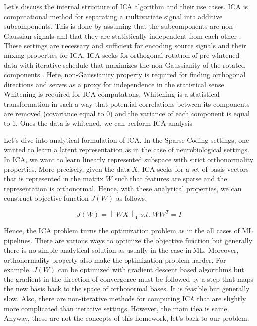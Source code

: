 \documentclass[12pt]{amsart}
\newcommand\norm[1]{\left\lVert#1\right\rVert}
\begin{document}
\bigskip
Let's discuss the internal structure of ICA algorithm and their use cases. ICA is computational method for separating a multivariate signal into additive subcomponents. This is done by assuming that the subcomponents are non-Gaussian signals and that they are statistically independent from each other \cite{enwiki:1007441084}. These settings are necessary and sufficient for encoding source signals and their mixing properties for ICA. ICA seeks for orthogonal rotation of pre-whitened data with iterative schedule that maximizes the non-Gaussianity of the rotated components \cite{enwiki:1007441084}. Here, non-Gaussianity property is required for finding orthogonal directions and serves as a proxy for independence in the statistical sense. Whitening is required for ICA computations. Whitening is a statistical transformation in such a way that potential correlations between its components are removed (covariance equal to 0) and the variance of each component is equal to 1. Ones the data is whitened, we can perform ICA analysis. 

\bigskip
Let's dive into analytical formulation of ICA. In the Sparse Coding settings, one wanted to learn a latent representation as in the case of neurobiological settings. In ICA, we want to learn linearly represented subspace with strict orthonormality properties. More precisely, given the data $X$, ICA seeks for a set of basis vectors that is represented in the matrix $W$ such that features are sparse and the representation is orthonormal. Hence, with these analytical properties, we can construct objective function $J(W)$ as follows.

\begin{equation}
    J(W) = \norm{WX}_1 \textit{ s.t. } WW^T = I
\end{equation}

Hence, the ICA problem turns the optimization problem as in the all cases of ML pipelines. There are various ways to optimize the objective function but generally there is no simple analytical solution as usually in the case in ML. Moreover, orthonormality property also make the optimization problem harder. For example, $J(W)$ can be optimized with gradient descent based algorithms but the gradient in the direction of convergence must be followed by a step that maps the new basis back to the space of orthonormal bases. It is feasible but generally slow. Also, there are non-iterative methods for computing ICA that are slightly more complicated than iterative settings. However, the main idea is same. Anyway, these are not the concepts of this homework, let's back to our problem.
\end{document}
